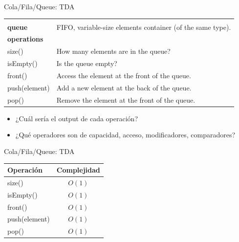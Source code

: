 \documentclass{beamer} %
\begin{document}
\begin{frame}{Cola/Fila/Queue: TDA}
    \scriptsize{
    \begin{tabular}{lp{60ex}}\hline\\[-1ex]
      {\bf\normalsize queue} & FIFO, variable-size elements container (of the same type).\\[1.5ex]
      {\bf\small operations}  & \\
      size()            & How many elements are in the queue?\\
      isEmpty()         & Is the queue empty?\\
      front()           & Access the element at the front of the queue.\\
      push(element)     & Add a new element at the back of the queue.\\
      pop()             & Remove the element at the front of the queue. \\[1.5ex]\hline
    \end{tabular}

    \begin{itemize}
        \item<2-> ¿Cuál sería el output de cada operación?
        \item<2-> ¿Qué operadores son de capacidad, acceso, modificadores, comparadores?
    \end{itemize}}
\end{frame}

\begin{frame}{Cola/Fila/Queue: TDA}
    \scriptsize{
    \begin{center}
    \begin{tabular}{lc}\hline
      {\bf Operación}   & {\bf Complejidad}\\\hline
      size()            & $O(1)$\\
      isEmpty()         & $O(1)$\\
      front()           & $O(1)$\\
      push(element)     & $O(1)$\\
      pop()             & $O(1)$\\[1.5ex]\hline
    \end{tabular}
    \end{center}}
\end{frame}
\end{document}
